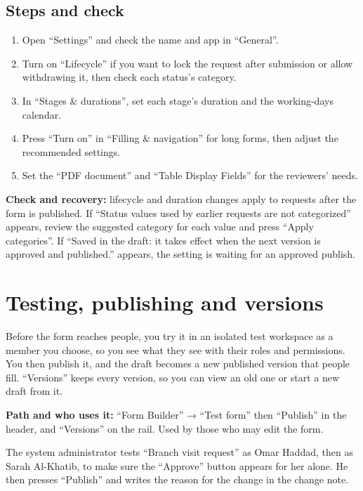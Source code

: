 \subsection{Steps and check}
\begin{enumerate}
\item Open “Settings” and check the name and app in “General”.
\item Turn on “Lifecycle” if you want to lock the request after submission or allow withdrawing it, then check each status's category.
\item In “Stages \& durations”, set each stage's duration and the working-days calendar.
\item Press “Turn on” in “Filling \& navigation” for long forms, then adjust the recommended settings.
\item Set the “PDF document” and “Table Display Fields” for the reviewers' needs.
\end{enumerate}

\textbf{Check and recovery:} lifecycle and duration changes apply to requests after the form is published. If “Status values used by earlier requests are not categorized” appears, review the suggested category for each value and press “Apply categories”. If “Saved in the draft: it takes effect when the next version is approved and published.” appears, the setting is waiting for an approved publish.

\clearpage
\section{Testing, publishing and versions}
\label{sec:builder-feature-forms-test-publish}

Before the form reaches people, you try it in an isolated test workspace as a member you choose, so you see what they see with their roles and permissions. You then publish it, and the draft becomes a new published version that people fill. “Versions” keeps every version, so you can view an old one or start a new draft from it.

\textbf{Path and who uses it:} “Form Builder” → “Test form” then “Publish” in the header, and “Versions” on the rail. Used by those who may edit the form.

\begin{rcnote}
The system administrator tests “Branch visit request” as Omar Haddad, then as Sarah Al-Khatib, to make sure the “Approve” button appears for her alone. He then presses “Publish” and writes the reason for the change in the change note.
\end{rcnote}


